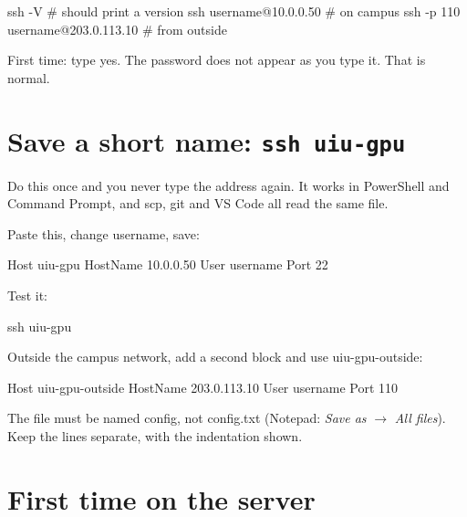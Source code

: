 \documentclass[12pt,a4paper]{article}
\newcommand{\cmd}[1]{{\ttfamily\small #1}}
\begin{document}
\begin{winblock}
ssh -V                              # should print a version
ssh username@10.0.0.50         # on campus
ssh -p 110 username@203.0.113.10  # from outside
\end{winblock}

First time: type \cmd{yes}. The password does not appear as you type it. That is normal.

\section{Save a short name: \texttt{ssh uiu-gpu}}

Do this once and you never type the address again. It works in PowerShell and Command Prompt, and
\cmd{scp}, \cmd{git} and VS Code all read the same file.


Paste this, change \cmd{username}, save:

\begin{winblock}
Host uiu-gpu
    HostName 10.0.0.50
    User username
    Port 22
\end{winblock}

Test it:

\begin{winblock}
ssh uiu-gpu
\end{winblock}

Outside the campus network, add a second block and use \cmd{uiu-gpu-outside}:

\begin{winblock}
Host uiu-gpu-outside
    HostName 203.0.113.10
    User username
    Port 110
\end{winblock}

\begin{warnbox}
The file must be named \cmd{config}, not \cmd{config.txt} (Notepad: \emph{Save as} $\rightarrow$
\emph{All files}). Keep the lines separate, with the indentation shown.
\end{warnbox}

\section{First time on the server}
\end{document}

